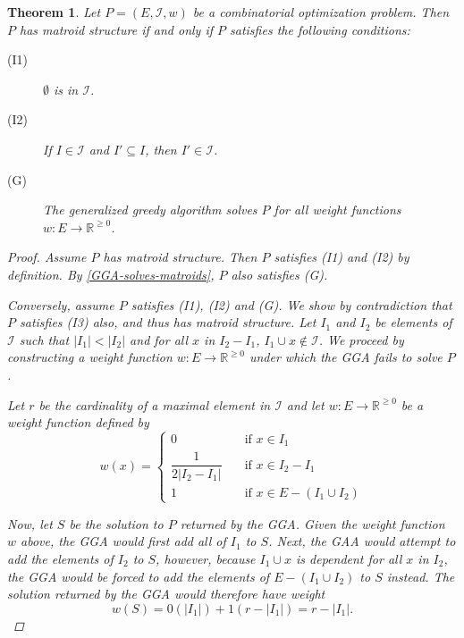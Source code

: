\documentclass[a4paper,11pt]{report}
\theoremstyle{plain}
\newtheorem{thm}{Theorem}[section]
\theoremstyle{definition}
\newcommand{\I}{\mathcal{I}}
\begin{document}
\begin{thm}\label{GGA-solves-only-matroids}
Let $P = (E,\I,w)$ be a combinatorial optimization problem. Then $P$ has matroid
structure if and only if $P$ satisfies the following conditions:
\begin{description}
    \item[(I1)] $\emptyset$ is in $\I$.
    \item[(I2)] If $I \in \I$ and $I' \subseteq I$, then $I' \in
                \I$.
    \item[(G)]  The generalized greedy algorithm solves $P$ for all weight
                functions $w:E \to \mathbb{R}^{\geq 0}$.
\end{description}
\begin{proof}

Assume $P$ has matroid structure. Then $P$ satisfies (I1) and (I2) by
definition. By \autoref{GGA-solves-matroids}, $P$ also satisfies (G).

Conversely, assume $P$ satisfies (I1), (I2) and (G). We show by contradiction
that $P$ satisfies (I3) also, and thus has matroid structure. Let $I_1$ and
$I_2$ be elements of $\I$ such that $|I_1| < |I_2|$ and for all $x$ in $I_2 -
I_1$, $I_1 \cup x \not\in \I$. We proceed by constructing a weight function $w:
E \to \mathbb{R}^{\geq 0}$ under which the GGA fails to solve $P$.

Let $r$ be the cardinality of a maximal element in $\I$ and let
$w: E \to \mathbb{R}^{\geq 0}$ be a weight function defined by
\begin{equation*}
    w(x) = \left\{
            \begin{array}{ll}
                0 & \quad \text{if } x \in I_1\\
                \dfrac{1}{2|I_2 - I_1|} & \quad \text{if } x \in I_2 - I_1\\
                1 & \quad \text{if } x \in E - (I_1 \cup I_2)
            \end{array}
            \right.
\end{equation*}

Now, let $S$ be the solution to $P$ returned by the GGA. Given the weight
function $w$ above, the GGA would first add all of $I_1$ to $S$. Next,
the GAA would attempt to add the elements of $I_2$ to $S$, however, because
$I_1 \cup x$ is dependent for all $x$ in $I_2$, the GGA would be forced to
add the elements of $E - (I_1 \cup I_2)$ to $S$ instead. The solution
returned by the GGA would therefore have weight
\begin{equation*}
    w(S) = 0(|I_1|) + 1(r - |I_1|) = r - |I_1|.
\end{equation*}


\end{proof}
\end{thm}
\end{document}
